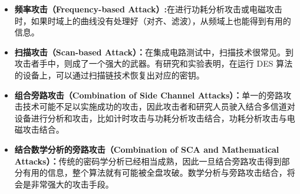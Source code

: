 \begin{itemize}
\item \textbf{频率攻击（Frequency-based Attack）:}在进行功耗分析攻击或电磁攻击时，如果时域上的曲线没有处理好（对齐、滤波），从频域上也能得到有用的信息。
\item \textbf{扫描攻击（Scan-based Attack）：}在集成电路测试中，扫描技术很常见。到攻击者手中，则成了一个强大的武器。有研究和实验表明，在运行 DES 算法的设备上，可以通过扫描链技术恢复出对应的密钥。
\item \textbf{组合旁路攻击（Combination of Side Channel Attacks）：}单一的旁路攻击技术可能不足以实施成功的攻击，因此攻击者和研究人员驶入结合多信道对设备进行分析和攻击，比如计时攻击与功耗分析攻击结合，功耗分析攻击与电磁攻击结合。
\item \textbf{结合数学分析的旁路攻击（Combination of SCA and Mathematical Attacks）：}传统的密码学分析已经相当成熟，因此一旦结合旁路攻击得到部分有用的信息，整个算法就有可能被全盘攻破。数学分析与旁路攻击结合，将会是非常强大的攻击手段。

\end{itemize}










